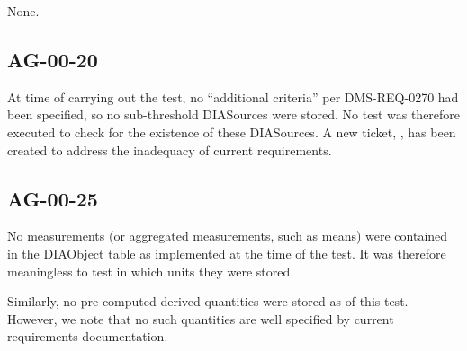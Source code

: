 \documentclass[DM,STR,toc]{lsstdoc}
\begin{document}
None.

\subsection{AG-00-20}
\label{sect:deviation-ag-00-20}

At time of carrying out the test, no ``additional criteria'' per DMS-REQ-0270 had been specified, so no sub-threshold DIASources were stored.
No test was therefore executed to check for the existence of these DIASources.
A new ticket, , has been created to address the inadequacy of current requirements.

\subsection{AG-00-25}
\label{sect:deviation-ag-00-25}

No measurements (or aggregated measurements, such as means) were contained in
the DIAObject table as implemented at the time of the test. It was
therefore meaningless to test in which units they were stored.

Similarly, no pre-computed derived quantities were stored as of this test.
However, we note that no such quantities are well specified by current requirements documentation.
\end{document}
